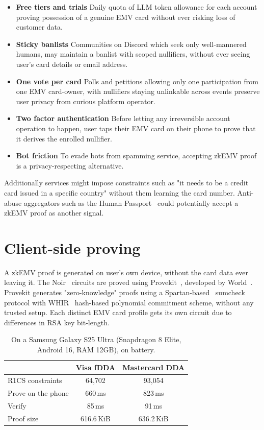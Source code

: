 \documentclass[10pt,a4paper]{article}
\begin{document}
\begin{itemize}
\item \textbf{Free tiers and trials}
Daily quota of LLM token allowance for each account proving possession of a genuine EMV card without ever risking loss of customer data.
\item \textbf{Sticky banlists}
Communities on Discord which seek only well-mannered humans, may maintain a banlist with scoped nullifiers, without ever seeing user's card details or email address.
\item \textbf{One vote per card}
Polls and petitions allowing only one participation from one EMV card-owner, with nullifiers staying unlinkable across events preserve user privacy from curious platform operator.
\item \textbf{Two factor authentication}
Before letting any irreversible account operation to happen, user taps their EMV card on their phone to prove that it derives the enrolled nullifier.
\item \textbf{Bot friction}
To evade bots from spamming service, accepting zkEMV proof is a privacy-respecting alternative.
\end{itemize}

Additionally services might impose constraints such as "it needs to be a credit card issued in a specific country" without them learning the card number.
Anti-abuse aggregators such as the Human Passport~\cite{human-passport} could potentially accept a zkEMV proof as another signal.

\section{Client-side proving}

A zkEMV proof is generated on user's own device, without the card data ever leaving it.
The Noir~\cite{noir} circuits are proved using Provekit~\cite{provekit}, developed by World~\cite{world-provekit}.
Provekit generates "zero-knowledge" proofs using a Spartan-based~\cite{DBLP:conf/crypto/Setty20} sumcheck protocol with WHIR~\cite{DBLP:conf/eurocrypt/ArnonCFY25} hash-based polynomial commitment scheme, without any trusted setup.
Each distinct EMV card profile gets its own circuit due to differences in RSA key bit-length.

\begin{table}[ht]
\centering
\begin{tabular}{@{}lcc@{}}
\toprule
& Visa fDDA & Mastercard DDA \\
\midrule
R1CS constraints & 64,702 & 93,054 \\
Prove on the phone & 660\,ms & 823\,ms \\
Verify & 85\,ms & 91\,ms \\
Proof size & 616.6\,KiB & 636.2\,KiB \\
\bottomrule
\end{tabular}
\caption{On a Samsung Galaxy S25 Ultra (Snapdragon 8 Elite, Android 16, RAM 12GB), on battery.}
\end{table}
\end{document}
